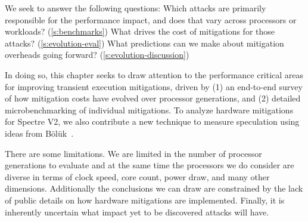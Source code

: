 We seek to answer the following questions: 
Which attacks are primarily responsible for the performance impact, and does that vary across processors or workloads? (\autoref{s:benchmarks})
What drives the cost of mitigations for those attacks? (\autoref{s:evolution-eval})
What predictions can we make about mitigation overheads going forward? (\autoref{s:evolution-discussion})




In doing so, this chapter seeks to draw attention to the performance critical areas for improving transient execution mitigations, driven by (1) an end-to-end survey of how mitigation costs have evolved over processor generations, and (2) detailed microbenchmarking of individual mitigations.
To analyze hardware mitigations for Spectre V2, we also contribute a new technique to measure speculation using ideas from Bölük~\cite{speculating-x86}.

There are some limitations.
We are limited in the number of processor generations to evaluate and at the same time the processors we do consider are diverse in terms of clock speed, core count, power draw, and many other dimensions.
Additionally the conclusions we can draw are constrained by the lack of public details on how hardware mitigations are implemented.  
Finally, it is inherently uncertain what impact yet to be discovered attacks will have.

